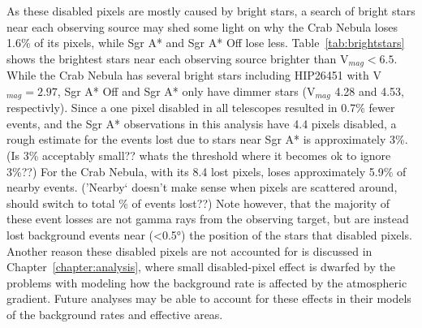     As these disabled pixels are mostly caused by bright stars, a search of bright stars near each observing source may shed some light on why the Crab Nebula loses 1.6\% of its pixels, while Sgr A* and Sgr A* Off lose less.
    Table~\ref{tab:brightstars} shows the brightest stars near each observing source brighter than V${}_{mag}<6.5$.
    While the Crab Nebula has several bright stars including HIP26451 with V${}_{mag} = 2.97$, Sgr A* Off and Sgr A* only have dimmer stars (V${}_{mag}$ 4.28 and 4.53, respectivly).
    Since a one pixel disabled in all telescopes resulted in 0.7\% fewer events, and the Sgr A* observations in this analysis have \nicetilde{}4.4 pixels disabled, a rough estimate for the events lost due to stars near Sgr A* is approximately 3\%.
    {\color{red}(Is 3\% acceptably small?? whats the threshold where it becomes ok to ignore 3\%??)}
    For the Crab Nebula, with its 8.4 lost pixels, loses approximately 5.9\% of nearby events.
    {\color{red}('Nearby` doesn't make sense when pixels are scattered around, should switch to total \% of events lost??)}
    Note however, that the majority of these event losses are not gamma rays from the observing target, but are instead lost background events near (<\ang{0.5}) the position of the stars that disabled pixels.
    Another reason these disabled pixels are not accounted for is discussed in Chapter~\ref{chapter:analysis}, where small disabled-pixel effect is dwarfed by the problems with modeling how the background rate is affected by the atmospheric gradient.
    Future analyses may be able to account for these effects in their models of the background rates and effective areas.

